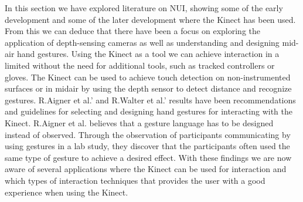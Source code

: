 In this section we have explored literature on NUI, showing some of the early development and some of the later development where the Kinect has been used. From this we can deduce that there have been a focus on exploring the application of depth-sensing cameras as well as understanding and designing mid-air hand gestures.
Using the Kinect as a tool we can achieve interaction in a limited  without the need for additional tools, such as tracked controllers or gloves. The Kinect can be used to achieve touch detection on non-instrumented surfaces or in midair by using the depth sensor to detect distance and recognize gestures.  R.Aigner et al.' and R.Walter et al.' results have been recommendations and guidelines for selecting and designing hand gestures for interacting with the Kinect. R.Aigner  et al. believes that a gesture language has to be designed instead of observed. Through the observation of participants communicating by using gestures in a lab study, they discover that the participants often used the same type of gesture to achieve a desired effect.
With these findings we are now aware of several applications where the Kinect can be used for interaction and which types of interaction techniques that provides the user with a good experience when using the Kinect.